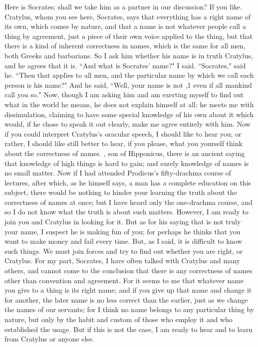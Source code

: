 \hermogenesspeaks
Here is Socrates; shall we take him as a partner in our discussion?
\cratylusspeaks
If you like.
\hermogenesspeaks
Cratylus, whom you see here, Socrates, says that everything has a right name of its own, which comes by nature, and that a name is not whatever people call a thing by agreement, just a piece of their own voice applied to the thing, but that there is a kind of inherent correctness in names, which is the same for all men,  both Greeks and barbarians. So I ask him whether his name is in truth Cratylus, and he agrees that it is. ``And what is Socrates' name?" I said. ``Socrates," said he. ``Then that applies to all men, and the particular name by which we call each person is his name?" And he said, ``Well, your name is not \hermogenesspeaks,1 even if all mankind call you so." Now, though I am asking him  and am exerting myself to find out what in the world he means, he does not explain himself at all; he meets me with dissimulation, claiming to have some special knowledge of his own about it which would, if he chose to speak it out clearly, make me agree entirely with him. Now if you could interpret Cratylus's oracular speech, I should like to hear you; or rather, I should like still better to hear, if you please, what you yourself think about the correctness of names.
\socratesspeaks
\hermogenesspeaks, son of Hipponicus, there is an ancient saying  that knowledge of high things is hard to gain; and surely knowledge of names is no small matter. Now if I had attended Prodicus's fifty-drachma course of lectures, after which, as he himself says, a man has a complete education on this subject, there would be nothing to hinder your learning the truth about the correctness of names at once; but I have heard only the one-drachma course,  and so I do not know what the truth is about such matters. However, I am ready to join you and Cratylus in looking for it. But as for his saying that \hermogenesspeaks is not truly your name, I suspect he is making fun of you; for perhaps he thinks that you want to make money and fail every time. But, as I said, it is difficult to know such things. We must join forces and try to find out whether you are right, or Cratylus.
\hermogenesspeaks
For my part, Socrates, I have often talked with Cratylus and many others,  and cannot come to the conclusion that there is any correctness of names other than convention and agreement. For it seems to me that whatever name you give to a thing is its right name; and if you give up that name and change it for another, the later name is no less correct than the earlier, just as we change the names of our servants; for I think no name belongs to any particular thing by nature, but only by the habit and custom of those who employ it and who established the usage.  But if this is not the case, I am ready to hear and to learn from Cratylus or anyone else. 
